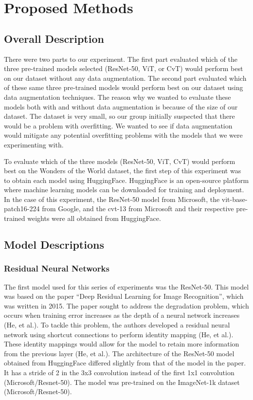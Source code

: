 \documentclass{article}
\begin{document}
\section{Proposed Methods}

\subsection{Overall Description}

There were two parts to our experiment. The first part evaluated which of the three pre-trained models selected (ResNet-50, ViT, or CvT) would perform best on our dataset without any data augmentation. The second part evaluated which of these same three pre-trained models would perform best on our dataset using data augmentation techniques. The reason why we wanted to evaluate these models both with and without data augmentation is because of the size of our dataset. The dataset is very small, so our group initially suspected that there would be a problem with overfitting. We wanted to see if data augmentation would mitigate any potential overfitting problems with the models that we were experimenting with.

To evaluate which of the three models (ResNet-50, ViT, CvT) would perform best on the Wonders of the World dataset, the first step of this experiment was to obtain each model using HuggingFace. HuggingFace is an open-source platform where machine learning models can be downloaded for training and deployment. In the case of this experiment, the ResNet-50 model from Microsoft, the vit-base-patch16-224 from Google, and the cvt-13 from Microsoft and their respective pre-trained weights were all obtained from HuggingFace. 

\subsection{Model Descriptions}

\subsubsection*{Residual Neural Networks}

The first model used for this series of experiments was the ResNet-50. This model was based on the paper “Deep Residual Learning for Image Recognition”, which was written in 2015. The paper sought to address the degradation problem, which occurs when training error increases as the depth of a neural network increases (He, et al.). To tackle this problem, the authors developed a residual neural network using shortcut connections to perform identity mapping (He, et al.). These identity mappings would allow for the model to retain more information from the previous layer (He, et al.). The architecture of the ResNet-50 model obtained from HuggingFace differed slightly from that of the model in the paper. It has a stride of 2 in the 3x3 convolution instead of the first 1x1 convolution (Microsoft/Resnet-50). The model was pre-trained on the ImageNet-1k dataset (Microsoft/Resnet-50).
\end{document}
